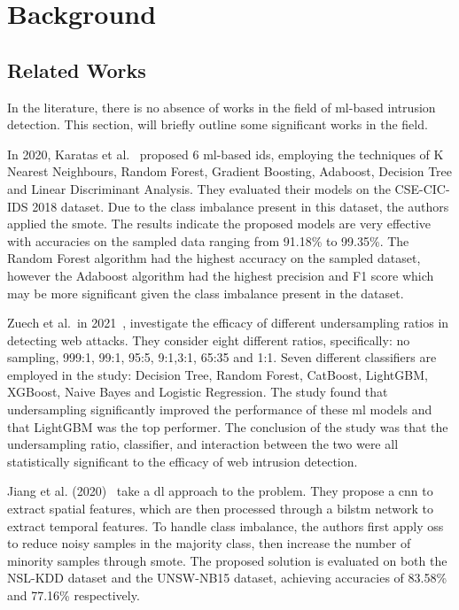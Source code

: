 \chapter{Background}%
\label{chp:background}

\section{Related Works}%
\label{sec:related}

In the literature, there is no absence of works in the field of \gls{ml}-based
intrusion detection. This section, will briefly outline some significant works
in the field.

In 2020, Karatas et al.~\cite{Karatas} proposed 6 \gls{ml}-based \gls{ids},
employing the techniques of K Nearest Neighbours, Random Forest, Gradient
Boosting, Adaboost, Decision Tree and Linear Discriminant Analysis. They
evaluated their models on the CSE-CIC-IDS 2018 dataset. Due to the class
imbalance present in this dataset, the authors applied the \gls{smote}. The
results indicate the proposed models are very effective with accuracies on the
sampled data ranging from 91.18\% to 99.35\%. The Random Forest algorithm had
the highest accuracy on the sampled dataset, however the Adaboost algorithm had
the highest precision and F1 score which may be more significant given the
class imbalance present in the dataset.

Zuech et al.\ in 2021~\cite{Zuech}, investigate the efficacy of different
undersampling ratios in detecting web attacks. They consider eight different
ratios, specifically: no sampling, 999:1, 99:1, 95:5, 9:1,3:1, 65:35 and 1:1.
Seven different classifiers are employed in the study: Decision Tree, Random
Forest, CatBoost, LightGBM, XGBoost, Naive Bayes and Logistic Regression. The
study found that undersampling significantly improved the performance of these
\gls{ml} models and that LightGBM was the top performer. The conclusion of the
study was that the undersampling ratio, classifier, and interaction between the
two were all statistically significant to the efficacy of web intrusion
detection.

Jiang et al. (2020)~\cite{Jiang} take a \gls{dl} approach to the problem. They
propose a \gls{cnn} to extract spatial features, which are then processed
through a \gls{bilstm} network to extract temporal features. To handle class
imbalance, the authors first apply \gls{oss} to reduce noisy samples in the
majority class, then increase the number of minority samples through
\gls{smote}. The proposed solution is evaluated on both the NSL-KDD dataset and
the UNSW-NB15 dataset, achieving accuracies of 83.58\% and 77.16\%
respectively.

